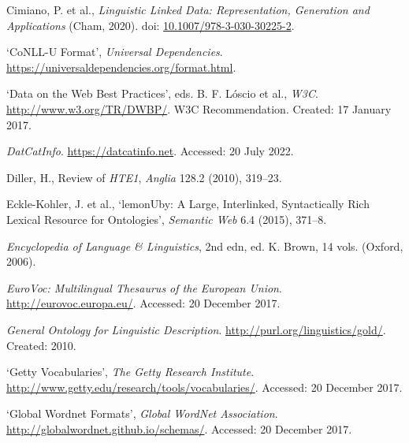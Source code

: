 \begin{list}{}
\item %
Cimiano, P. et al., \textit{Linguistic Linked Data: Representation, Generation and Applications} (Cham, 2020). doi: \href{https://doi.org/10.1007/978-3-030-30225-2}{\url{10.1007/978-3-030-30225-2}}.

\item %
`CoNLL-U Format', \textit{Universal Dependencies}. \url{https://universaldependencies.org/format.html}.

\item %
`Data on the Web Best Practices', eds. B. F.  Lóscio et al., \textit{W3C}. \url{http://www.w3.org/TR/DWBP/}. W3C Recommendation. Created: 17 January 2017.

\item %
\textit{DatCatInfo}. \url{https://datcatinfo.net}. Accessed: 20 July 2022.

\item %
Diller, H., Review of \textit{HTE1}, \textit{Anglia} 128.2 (2010), 319–23.

\item %
Eckle-Kohler, J. et al., `lemonUby: A Large, Interlinked, Syntactically Rich Lexical Resource for Ontologies', \textit{Semantic Web} 6.4 (2015), 371–8.


\item %
\textit{Encyclopedia of Language \& Linguistics}, 2nd edn, ed. K. Brown, 14 vols. (Oxford, 2006).

\item %
\textit{EuroVoc: Multilingual Thesaurus of the European Union}. \url{http://eurovoc.europa.eu/}. Accessed: 20 December 2017.

\item %
\textit{General Ontology for Linguistic Description}. \url{http://purl.org/linguistics/gold/}. Created: 2010.

\item %
`Getty Vocabularies', \textit{The Getty Research Institute}. \url{http://www.getty.edu/research/tools/vocabularies/}. Accessed: 20 December 2017.

\item %
`Global Wordnet Formats', \textit{Global WordNet Association}. \url{http://globalwordnet.github.io/schemas/}. Accessed: 20 December 2017.


\end{list}
